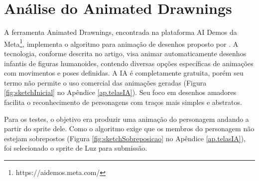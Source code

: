 \FloatBarrier
\section{Análise do Animated Drawnings}
\label{s.sketchLab}

A ferramenta Animated Drawnings, encontrada na plataforma AI Demos da Meta\footnote{https://aidemos.meta.com/}, implementa o algoritmo para animação de desenhos proposto por \cite{animated10.1145/3592788}. A tecnologia, conforme descrita no artigo, visa animar automaticamente desenhos infantis de figuras humanoides, contendo diversas opções específicas de animações com movimentos e poses definidas. A IA é completamente gratuita, porém seu termo não permite o uso comercial das animações geradas (Figura \ref{fig:sketchInicial} no Apêndice \ref{ap.telasIA}). Seu foco em desenhos amadores facilita o reconhecimento de personagens com traços mais simples e abstratos.

Para os testes, o objetivo era produzir uma animação do personagem andando a partir do sprite dele. Como o algoritmo exige que os membros do personagem não estejam sobrepostos (Figura \ref{fig:sketchSobreposicao} no Apêndice \ref{ap.telasIA}), foi selecionado o sprite de Luz para submissão.

